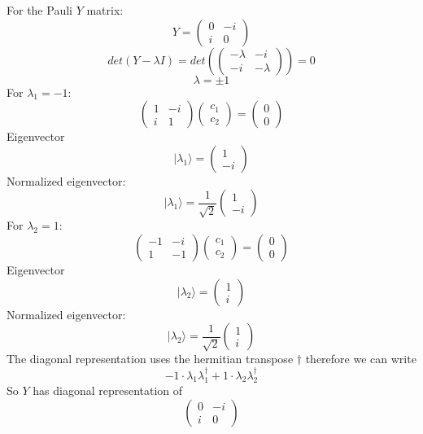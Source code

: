 \documentclass[12pt]{article}
\newcommand{\ket}[1]{\vert{#1}\rangle}
\begin{document}
\begin{enumerate}
For the Pauli $Y$ matrix:
$$ Y = \left(\begin{array}{cc} 0 & -i \\ i & 0  \end{array}\right) $$
$$ det(Y-\lambda I) = det(\left(\begin{array}{cc} -\lambda & -i \\ -i & -\lambda  \end{array}\right) ) = 0 $$
$$ \lambda = \pm 1 $$ 
For $\lambda_1 = -1$:
$$ \left(\begin{array}{cc} 1 & -i \\ i & 1  \end{array}\right) \left(\begin{array}{cc} c_1 \\ c_2 \end{array}\right) = \left(\begin{array}{cc} 0 \\ 0 \end{array}\right) $$
Eigenvector 
$$ \ket{\lambda_1} =  \left(\begin{array}{cc} 1 \\ -i\end{array}\right) $$
Normalized eigenvector: 
$$  \ket{\lambda_1} = \frac{1}{\sqrt{2}} \left(\begin{array}{cc} 1 \\ -i\end{array}\right) $$
For $\lambda_2 =1$:
$$ \left(\begin{array}{cc} -1 & -i \\ 1 & -1  \end{array}\right) \left(\begin{array}{cc} c_1 \\ c_2 \end{array}\right) = \left(\begin{array}{cc} 0 \\ 0 \end{array}\right) $$
Eigenvector 
$$ \ket{\lambda_2} =  \left(\begin{array}{cc} 1 \\ i\end{array}\right) $$
Normalized eigenvector: 
$$  \ket{\lambda_2} = \frac{1}{\sqrt{2}} \left(\begin{array}{cc} 1 \\ i\end{array}\right) $$
The diagonal representation uses the hermitian transpose $\dagger$ therefore we can write 
$$ -1 \cdot \lambda_1 \lambda_1^\dagger + 1\cdot \lambda_2 \lambda_2^\dagger $$
So $Y$ has diagonal representation of 
$$ \left(\begin{array}{cc} 0 & -i \\ i & 0\end{array}\right) $$


\end{enumerate}
\end{document}
